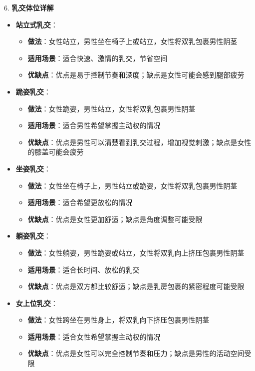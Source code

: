 \documentclass[12pt,UTF8]{ctexbook}
\begin{document}
6. \textbf{乳交体位详解}
\begin{itemize}
	\item \textbf{站立式乳交}：
	\begin{itemize}
		\item \textbf{做法}：女性站立，男性坐在椅子上或站立，女性将双乳包裹男性阴茎
		\item \textbf{适用场景}：适合快速、激情的乳交，节省空间
		\item \textbf{优缺点}：优点是易于控制节奏和深度；缺点是女性可能会感到腿部疲劳
	\end{itemize}
	\item \textbf{跪姿乳交}：
	\begin{itemize}
		\item \textbf{做法}：女性跪姿，男性站立，女性将双乳包裹男性阴茎
		\item \textbf{适用场景}：适合男性希望掌握主动权的情况
		\item \textbf{优缺点}：优点是男性可以清楚看到乳交过程，增加视觉刺激；缺点是女性的膝盖可能会疲劳
	\end{itemize}
	\item \textbf{坐姿乳交}：
	\begin{itemize}
		\item \textbf{做法}：女性坐在椅子上，男性站立或跪姿，女性将双乳包裹男性阴茎
		\item \textbf{适用场景}：适合希望更放松的情况
		\item \textbf{优缺点}：优点是女性更加舒适；缺点是角度调整可能受限
	\end{itemize}
	\item \textbf{躺姿乳交}：
	\begin{itemize}
		\item \textbf{做法}：女性躺姿，男性跪姿或站立，女性将双乳向上挤压包裹男性阴茎
		\item \textbf{适用场景}：适合长时间、放松的乳交
		\item \textbf{优缺点}：优点是双方都比较舒适；缺点是乳房包裹的紧密程度可能受限
	\end{itemize}
	\item \textbf{女上位乳交}：
	\begin{itemize}
		\item \textbf{做法}：女性跨坐在男性身上，将双乳向下挤压包裹男性阴茎
		\item \textbf{适用场景}：适合女性希望掌握主动权的情况
		\item \textbf{优缺点}：优点是女性可以完全控制节奏和压力；缺点是男性的活动空间受限
	\end{itemize}

\end{itemize}
\end{document}
